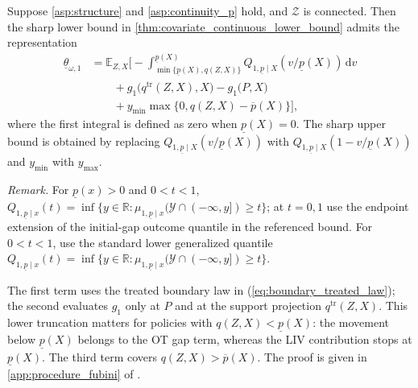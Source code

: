 \begin{proposition}\label{prop:continuous_reduction}
    Suppose \cref{asp:structure} and \cref{asp:continuity_p} hold, and $\mathcal{Z}$ is connected. Then the sharp lower bound in \cref{thm:covariate_continuous_lower_bound} admits the representation
    \begin{equation} \label{eq:continuous_simplified_target}
     \begin{split}
            \underline{\theta}_{\omega, 1} &= \mathbb{E}_{Z,X} \Bigg[ - \int_{\min\{\underline{p}(X), q(Z,X)\}}^{\underline{p}(X)} Q_{1,\underline p\mid X}\!\left({v}/{\underline{p}(X)}\right) \, \mathrm{d}v \\
        &\qquad + g_1\big(q^{\mathrm{tr}}(Z,X), X\big) - g_1\big(P, X\big)  \\
        &\qquad + y_{\min} \max\{0, q(Z,X) - \overline{p}(X)\} \Bigg],
     \end{split}
    \end{equation}
    where the first integral is defined as zero when $\underline{p}(X)=0$. The sharp upper bound is obtained by replacing $Q_{1,\underline p\mid X}(v/\underline{p}(X))$ with $Q_{1,\underline p\mid X}(1-v/\underline{p}(X))$ and $y_{\min}$ with $y_{\max}$. 
\end{proposition}

\noindent\textit{Remark.} For $\underline p(x)>0$ and $0<t<1$, $Q_{1,\underline p\mid x}(t)=\inf\{y\in\mathbb R:\mu_{1,\underline p\mid x}(\mathcal Y\cap(-\infty,y])\geqslant t\}$; at $t=0,1$ use the endpoint extension of the initial-gap outcome quantile in the referenced bound. For $0<t<1$, use the standard lower generalized quantile $Q_{1,\underline p\mid x}(t)=\inf\{y\in\mathbb R:\mu_{1,\underline p\mid x}(\mathcal Y\cap(-\infty,y])\geqslant t\}$.


The first term uses the treated boundary law in (\ref{eq:boundary_treated_law}); the second evaluates $g_1$ only at $P$ and at the support projection $q^{\mathrm{tr}}(Z,X)$. This lower truncation matters for policies with $q(Z,X)<\underline{p}(X)$: the movement below $\underline{p}(X)$ belongs to the OT gap term, whereas the LIV contribution stops at $\underline{p}(X)$. The third term covers $q(Z,X)>\overline{p}(X)$. The proof is given in \cref{app:procedure_fubini} of \oalocation.

